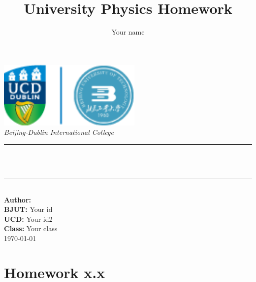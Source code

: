 \documentclass[12pt]{article}
\title{University Physics Homework}
\author{Your name} %
\begin{document}
    
\begin{titlepage} %
    \newcommand{\HRule}{\rule{\linewidth}{0.5mm}}
    \begin{center}
        \includegraphics[width=7cm]{ucdBDIC_logo.png}
        \quad\\[1.5cm]
        \textsl{\Large Beijing-Dublin International College }\\[0.5cm] 
        \makeatletter
        \HRule \\[0.4cm]
	    { \huge \bfseries \@title}\\[0.5cm] 
	    \HRule \\[1.5cm]
		{\large \textbf{Author:} \@author}\\[0.8cm] 
		{\large \textbf{BJUT:} Your id}\\[0.8cm] %
		{\large \textbf{UCD:} Your id2}\\[0.8cm] %
        {\large \textbf{Class:} Your class} \\[5cm] %
	    {\large \today}\\[2cm] 
    \end{center}
\end{titlepage}

\section{Homework x.x}
\subsection{}
\subsection{}
\end{document}
